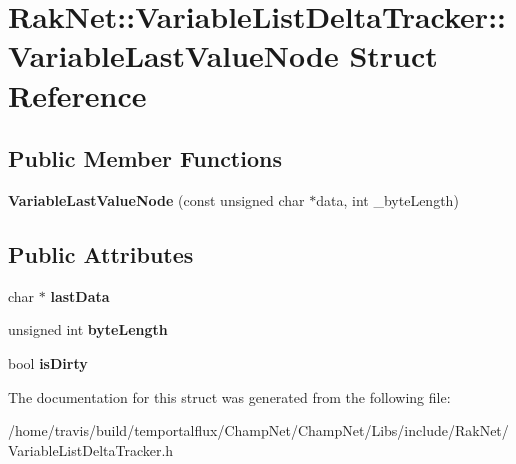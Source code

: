\hypertarget{struct_rak_net_1_1_variable_list_delta_tracker_1_1_variable_last_value_node}{\section{Rak\-Net\-:\-:Variable\-List\-Delta\-Tracker\-:\-:Variable\-Last\-Value\-Node Struct Reference}
\label{struct_rak_net_1_1_variable_list_delta_tracker_1_1_variable_last_value_node}
}
\subsection*{Public Member Functions}
\begin{DoxyCompactItemize}
\item 
\hypertarget{struct_rak_net_1_1_variable_list_delta_tracker_1_1_variable_last_value_node_a2a113be4ed969bd921a46f4fc66c3fb0}{{\bfseries Variable\-Last\-Value\-Node} (const unsigned char $\ast$data, int \-\_\-byte\-Length)}\label{struct_rak_net_1_1_variable_list_delta_tracker_1_1_variable_last_value_node_a2a113be4ed969bd921a46f4fc66c3fb0}

\end{DoxyCompactItemize}
\subsection*{Public Attributes}
\begin{DoxyCompactItemize}
\item 
\hypertarget{struct_rak_net_1_1_variable_list_delta_tracker_1_1_variable_last_value_node_a1dd640ffd5faf5b83e452416fcd64967}{char $\ast$ {\bfseries last\-Data}}\label{struct_rak_net_1_1_variable_list_delta_tracker_1_1_variable_last_value_node_a1dd640ffd5faf5b83e452416fcd64967}

\item 
\hypertarget{struct_rak_net_1_1_variable_list_delta_tracker_1_1_variable_last_value_node_a58792fa298a9829aecf7eecab899f05d}{unsigned int {\bfseries byte\-Length}}\label{struct_rak_net_1_1_variable_list_delta_tracker_1_1_variable_last_value_node_a58792fa298a9829aecf7eecab899f05d}

\item 
\hypertarget{struct_rak_net_1_1_variable_list_delta_tracker_1_1_variable_last_value_node_a896feff74f0ae160f159adb840660491}{bool {\bfseries is\-Dirty}}\label{struct_rak_net_1_1_variable_list_delta_tracker_1_1_variable_last_value_node_a896feff74f0ae160f159adb840660491}

\end{DoxyCompactItemize}


The documentation for this struct was generated from the following file\-:\begin{DoxyCompactItemize}
\item 
/home/travis/build/temportalflux/\-Champ\-Net/\-Champ\-Net/\-Libs/include/\-Rak\-Net/Variable\-List\-Delta\-Tracker.\-h\end{DoxyCompactItemize}

